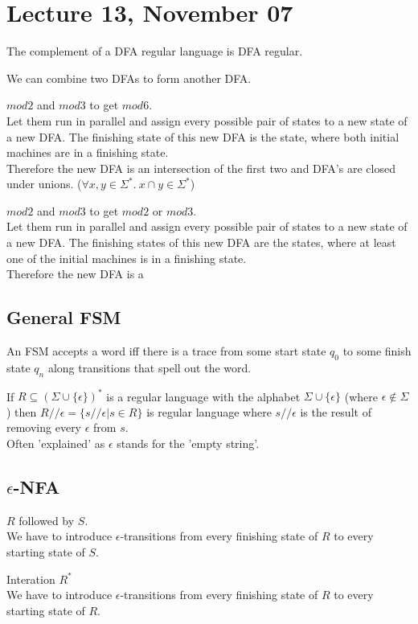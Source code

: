 \documentclass{article}
\begin{document}
\section{Lecture 13, November 07}
\begin{theorem}
	The complement of a DFA regular language is DFA regular.
\end{theorem}
We can combine two DFAs to form another DFA.
\begin{example}
	$mod 2$ and $mod 3$ to get $mod 6$.\\
	Let them run in parallel and assign every possible pair of states to a new state of a new DFA. The finishing state of this new DFA is the state, where both initial machines are in a finishing state.\\
	Therefore the new DFA is an intersection of the first two and DFA's are closed under unions. ($\forall x, y \in \Sigma^{*}.\: x \cap y \in \Sigma^{*}$)
\end{example}
\begin{example}
	$mod 2$ and $mod 3$ to get $mod 2$ or $mod 3$.\\
	Let them run in parallel and assign every possible pair of states to a new state of a new DFA.
	The finishing states of this new DFA are the states, where at least one of the initial machines is in a finishing state.\\
	Therefore the new DFA is a
\end{example}
\subsection{General FSM}
An FSM accepts a word iff there is a trace from some start state $q_0$ to some finish state $q_n$ along transitions that spell out the word.
\begin{definition}
	If $R\subseteq (\Sigma \cup \{\epsilon\})^*$ is a regular language with the alphabet $\Sigma \cup \{\epsilon\}$ (where $\epsilon \not\in \Sigma$) then $R // \epsilon = \{s//\epsilon | s\in R\}$ is regular language where $s//\epsilon$ is the result of removing every $\epsilon$ from $s$.\\
	Often 'explained' as $\epsilon$ stands for the 'empty string'.
\end{definition}
\subsection{$\epsilon$-NFA}
\begin{example}
	$R$ followed by $S$.\\
	We have to introduce $\epsilon$-transitions from every finishing state of $R$ to every starting state of $S$.
\end{example}
\begin{example}
	Interation $R^*$\\
	We have to introduce $\epsilon$-transitions from every finishing state of $R$ to every starting state of $R$.
\end{example}
\end{document}
